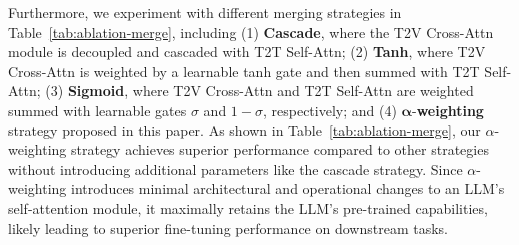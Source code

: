 
Furthermore, we experiment with different merging strategies in Table~\ref{tab:ablation-merge}, including (1) \textbf{Cascade}, where the T2V Cross-Attn module is decoupled and cascaded with T2T Self-Attn; (2) \textbf{Tanh}, where T2V Cross-Attn is weighted by a learnable tanh gate and then summed with T2T Self-Attn; (3) \textbf{Sigmoid}, where T2V Cross-Attn and T2T Self-Attn are weighted summed with learnable gates $\sigma$ and $1-\sigma$, respectively; and (4) $\bm{\alpha}$-\textbf{weighting} strategy proposed in this paper.
As shown in Table~\ref{tab:ablation-merge}, our $\alpha$-weighting strategy achieves superior performance compared to other strategies without introducing additional parameters like the cascade strategy.
Since $\alpha$-weighting introduces minimal architectural and operational changes to an LLM's self-attention module, it maximally retains the LLM's pre-trained capabilities, likely leading to superior fine-tuning performance on downstream tasks.




